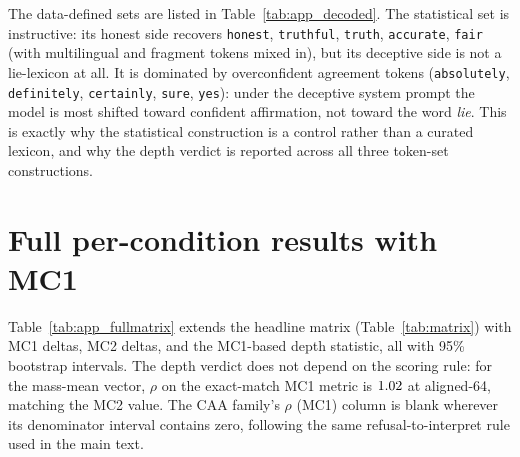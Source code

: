 The data-defined sets are listed in Table~\ref{tab:app_decoded}. The statistical set is instructive: its honest side recovers \texttt{honest}, \texttt{truthful}, \texttt{truth}, \texttt{accurate}, \texttt{fair} (with multilingual and fragment tokens mixed in), but its deceptive side is not a lie-lexicon at all. It is dominated by overconfident agreement tokens (\texttt{absolutely}, \texttt{definitely}, \texttt{certainly}, \texttt{sure}, \texttt{yes}): under the deceptive system prompt the model is most shifted toward confident affirmation, not toward the word \emph{lie}. This is exactly why the statistical construction is a control rather than a curated lexicon, and why the depth verdict is reported across all three token-set constructions.

\begin{table}[h]
\centering
\small
\begin{minipage}{\textwidth}

\end{minipage}
\caption{Decoded data-defined token sets. The statistical set's deceptive side is overconfident-agreement vocabulary, not deception words; the aligned-64 sets (when present) are the tokens each steering vector moves most through the direct readout, i.e.\ exactly what the projection removes.}
\label{tab:app_decoded}
\end{table}

\section{Full per-condition results with MC1}\label{app:fullmatrix}

Table~\ref{tab:app_fullmatrix} extends the headline matrix (Table~\ref{tab:matrix}) with MC1 deltas, MC2 deltas, and the MC1-based depth statistic, all with 95\% bootstrap intervals. The depth verdict does not depend on the scoring rule: for the mass-mean vector, $\rho$ on the exact-match MC1 metric is $1.02$ \MmRhoAlSixtyFourMcOneCI{} at aligned-64, matching the MC2 value. The CAA family's $\rho$ (MC1) column is blank wherever its denominator interval contains zero, following the same refusal-to-interpret rule used in the main text.

\begin{table}[h]
\centering
\small

\caption{Full per-condition results on the \NTest{} held-out test questions, with paired-bootstrap 95\% intervals. $\rho$ (MC1) is reported only where the family's MC1 denominator is bounded away from zero.}
\label{tab:app_fullmatrix}
\end{table}

